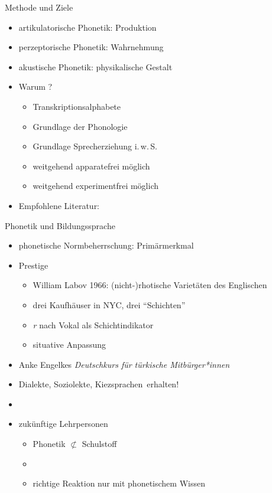 \begin{frame}
  {Methode und Ziele}
  \pause
  \begin{itemize}[<+->]
    \item \alert{artikulatorische} Phonetik: Produktion
    \item \alert{perzeptorische} Phonetik: Wahrnehmung
    \item \alert{akustische} Phonetik: physikalische Gestalt
    \vspace{\baselineskip}
  \item Warum ?
    \begin{itemize}[<+->]
      \item Transkriptionsalphabete
      \item Grundlage der Phonologie
      \item Grundlage Sprecherziehung i.\,w.\,S.
      \item weitgehend apparatefrei möglich
      \item weitgehend experimentfrei möglich
    \end{itemize}
    \vspace{\baselineskip}
  \item Empfohlene Literatur: \citet{RuesEa2009}
  \end{itemize}
\end{frame}

\begin{frame}
  {Phonetik und Bildungssprache}
  \pause
  \begin{itemize}[<+->]
    \item phonetische Normbeherrschung: Primärmerkmal
    \vspace{0.5\baselineskip}
    \item Prestige
      \begin{itemize}[<+->]
        \item William Labov 1966: (nicht-)rhotische Varietäten des Englischen
        \item drei Kaufhäuser in NYC, drei "`Schichten"'
        \item \textit{r} nach Vokal als \alert{Schichtindikator}
        \item situative Anpassung
      \end{itemize}
  \item Anke Engelkes \textit{Deutschkurs für türkische Mitbürger*innen}
    \vspace{0.5\baselineskip}
    \item \alert{Dialekte, Soziolekte, Kiezsprachen erhalten!}
    \item {}
    \item zukünftige Lehrpersonen
      \begin{itemize}
        \item Phonetik $\not\subset$ Schulstoff
        \item {}
        \item \alert{richtige Reaktion nur mit phonetischem Wissen}
      \end{itemize}
  \end{itemize}
\end{frame}

